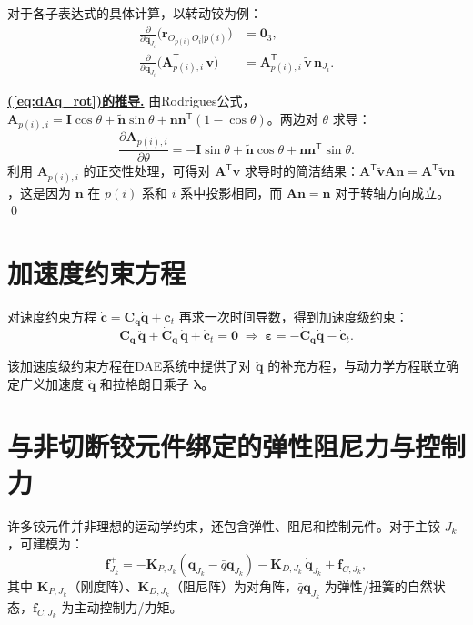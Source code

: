 \documentclass[10pt,a4paper]{book}
\theoremstyle{thmstyle}
\theoremstyle{defstyle}
\theoremstyle{prostyle}
\renewenvironment{proof}[1][证明]{\par{\kaishu \underline{\textbf{#1.}}} \;\fangsong}{\qed\par}
\newcommand{\T}{^{\mathsf{T}}}
\renewcommand{\vec}[1]{\bm{#1}}
\newcommand{\mat}[1]{\bm{#1}}
\newcommand{\tildev}[1]{\tilde{#1}}
\newcommand{\qbar}{\bar{q}}
\begin{document}
对于各子表达式的具体计算，以转动铰为例：
\begin{align}
\frac{\partial}{\partial\vec{q}_{J_i}}\bigl(\vec{r}_{O_{p(i)}O_i|p(i)}\bigr) &= \mat{0}_3, \label{eq:drdq_rot}\\
\frac{\partial}{\partial\vec{q}_{J_i}}\bigl(\mat{A}_{p(i),i}\T\,\vec{v}\bigr) &= \mat{A}_{p(i),i}\T\,\tildev{\vec{v}}\,\vec{n}_{J_i}. \label{eq:dAq_rot}
\end{align}

\begin{proof}[(\ref{eq:dAq_rot})的推导]
由Rodrigues公式，$\mat{A}_{p(i),i} = \mat{I}\cos\theta + \tildev{\vec{n}}\sin\theta + \vec{n}\vec{n}\T(1-\cos\theta)$。两边对 $\theta$ 求导：
\[
\frac{\partial\mat{A}_{p(i),i}}{\partial\theta}
= -\mat{I}\sin\theta + \tildev{\vec{n}}\cos\theta + \vec{n}\vec{n}\T\sin\theta.
\]
利用 $\mat{A}_{p(i),i}$ 的正交性处理，可得对 $\mat{A}\T\vec{v}$ 求导时的简洁结果：$\mat{A}\T\tildev{\vec{v}}\mat{A}\vec{n} = \mat{A}\T\tildev{\vec{v}}\vec{n}$，这是因为 $\vec{n}$ 在 $p(i)$ 系和 $i$ 系中投影相同，而 $\mat{A}\vec{n} = \vec{n}$ 对于转轴方向成立。
\end{proof}


\section{加速度约束方程}

对速度约束方程 $\dot{\vec{c}} = \mat{C}_{\vec{q}}\dot{\vec{q}} + \vec{c}_t$ 再求一次时间导数，得到加速度级约束：
\begin{equation}
\mat{C}_{\vec{q}}\,\ddot{\vec{q}} + \dot{\mat{C}}_{\vec{q}}\,\dot{\vec{q}} + \dot{\vec{c}}_t = \vec{0}
\;\Longrightarrow\;
\vec{\varepsilon} = -\dot{\mat{C}}_{\vec{q}}\dot{\vec{q}} - \dot{\vec{c}}_t.
\label{eq:acc_constraint}
\end{equation}

该加速度级约束方程在DAE系统中提供了对 $\ddot{\vec{q}}$ 的补充方程，与动力学方程联立确定广义加速度 $\ddot{\vec{q}}$ 和拉格朗日乘子 $\vec{\lambda}$。


\section{与非切断铰元件绑定的弹性阻尼力与控制力}

许多铰元件并非理想的运动学约束，还包含弹性、阻尼和控制元件。对于主铰 $J_k$，可建模为：
\begin{equation}
\vec{f}_{J_k}^{+} = -\mat{K}_{P,J_k}(\vec{q}_{J_k} - \qbar{\vec{q}}_{J_k})
- \mat{K}_{D,J_k}\,\dot{\vec{q}}_{J_k} + \vec{f}_{C,J_k},
\label{eq:joint_force}
\end{equation}
其中 $\mat{K}_{P,J_k}$（刚度阵）、$\mat{K}_{D,J_k}$（阻尼阵）为对角阵，$\qbar{\vec{q}}_{J_k}$ 为弹性/扭簧的自然状态，$\vec{f}_{C,J_k}$ 为主动控制力/力矩。
\end{document}
